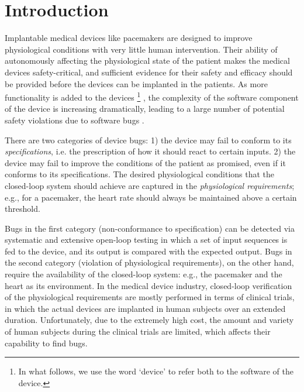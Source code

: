 \section{Introduction}
\label{introduction}

Implantable medical devices like pacemakers are designed to improve physiological conditions with very little human intervention. 
Their ability of autonomously affecting the physiological state of the patient makes the medical devices safety-critical, and sufficient evidence for their safety and efficacy should be provided before the devices can be implanted in the patients. 
As more functionality is added to the devices
\footnote{In what follows, we use the word `device' to refer both to the software of the device.}
, the complexity of the software component of the device is increasing dramatically, leading to a large number of potential safety violations due to software bugs \cite{recall_stats}.


There are two categories of device bugs: 
1) the device may fail to conform to its \emph{specifications}, i.e. the prescription of how it should react to certain inputs.  
2) the device may fail to improve the conditions of the patient as promised, even if it conforms to its specifications. 
The desired physiological conditions that the closed-loop system should achieve are captured in the \emph{physiological requirements}; e.g., for a pacemaker, the heart rate should always be maintained above a certain threshold. 

Bugs in the first category (non-conformance to specification) can be detected via systematic and extensive open-loop testing in which a set of input sequences is fed to the device, and its output is compared with the expected output.
Bugs in the second category (violation of physiological requirements), on the other hand, require the availability of the closed-loop system: e.g., the pacemaker and the heart as its environment. 
In the medical device industry, closed-loop verification of the physiological requirements are mostly performed in terms of clinical trials, in which the actual devices are implanted in human subjects over an extended duration.
Unfortunately, due to the extremely high cost, the amount and variety of human subjects during the clinical trials are limited, which affects their capability to find bugs. 

